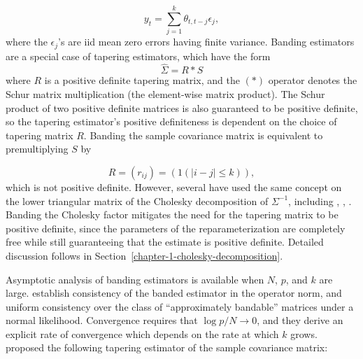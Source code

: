 \begin{equation*} 
y_t = \sum_{j = 1}^k \theta_{t, t-j} \epsilon_j,
\end{equation*}
\noindent
where the $\epsilon_j$'s are iid mean zero errors having finite variance. Banding estimators are a special case of tapering estimators, which have the form
\begin{equation} \label{eq:general-tapering-estimator} 
\hat{\Sigma} = R \ast S 
\end{equation}
\noindent
where $R$ is a positive definite tapering matrix, and the $\left( \ast \right)$ operator denotes the Schur matrix multiplication (the element-wise matrix product). The Schur product of two positive definite matrices is also guaranteed to be positive definite, so the tapering estimator's positive definiteness is dependent on the choice of tapering matrix $R$. Banding the sample covariance matrix is equivalent to premultiplying $S$ by 

\[
R = \left(r_{ij}\right) = \left( 1\left(\vert i-j \vert \le k\right)\right),
\] 
\noindent
which is not positive definite. However, several have used the same concept on the lower triangular matrix of the Cholesky decomposition of $\Sigma^{-1}$, including \cite{wu2003nonparametric}, \cite{huang2006covariance}, \cite{levina2008sparse}. Banding the Cholesky factor mitigates the need for the tapering matrix to be positive definite, since the parameters of the reparameterization are completely free while still guaranteeing that the estimate is positive definite. Detailed discussion follows in Section~\ref{chapter-1-cholesky-decomposition}. 

\bigskip

Asymptotic analysis of banding estimators is available when $N$, $p$, and $k$ are large. \cite{bickel2008regularized} establish consistency of the banded estimator in the operator norm, and uniform consistency over the class of ``approximately bandable'' matrices under a normal likelihood. Convergence requires that $\log p/ N \rightarrow 0$, and they derive an explicit rate of convergence which depends on the rate at which $k$ grows. \cite{cai2010optimal} proposed the following tapering estimator of the sample covariance matrix:

